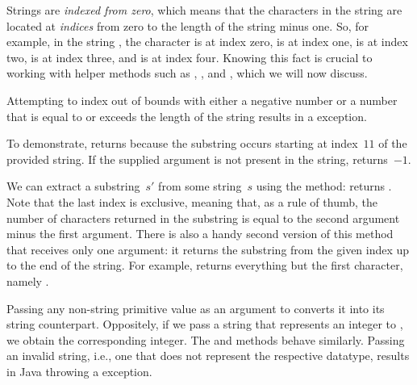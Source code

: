 Strings are \emph{indexed from zero}, which means that the characters in the string are located at \emph{indices} from zero to the length of the string minus one. 
So, for example, in the string , the character  is at index zero,  is at index one,  is at index two,  is at index three, and  is at index four. 
Knowing this fact is crucial to working with helper methods such as , , and , which we will now discuss.

Attempting to index out of bounds with either a negative number or a number that is equal to or exceeds the length of the string results in a  exception.

To demonstrate,  returns  because the substring  occurs starting at index~$11$ of the provided string. 
If the supplied argument is not present in the string,  returns~$-1$.

We can extract a substring~$s'$ from some string~$s$ using the  method:  returns . 
Note that the last index is exclusive, meaning that, as a rule of thumb, the number of characters returned in the substring is equal to the second argument minus the first argument. 
There is also a handy second version of this method that receives only one argument: it returns the substring from the given index up to the end of the string. 
For example,  returns everything but the first character, namely .

Passing any non-string primitive value as an argument to  converts it into its string counterpart.
Oppositely, if we pass a string that represents an integer to , we obtain the corresponding integer. 
The  and  methods behave similarly. 
Passing an invalid string, i.e., one that does not represent the respective datatype, results in Java throwing a  exception.

